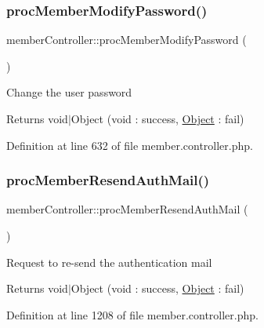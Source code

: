 \subsubsection{\texorpdfstring{proc\+Member\+Modify\+Password()}{procMemberModifyPassword()}}
{\footnotesize\ttfamily member\+Controller\+::proc\+Member\+Modify\+Password (\begin{DoxyParamCaption}{ }\end{DoxyParamCaption})}

Change the user password

\begin{DoxyReturn}{Returns}
void$\vert$\+Object (void \+: success, \hyperlink{classObject}{Object} \+: fail) 
\end{DoxyReturn}


Definition at line 632 of file member.\+controller.\+php.

\mbox{\label{classmemberController_aa0e4416a4e98fc31701ba68581b7c14b}} 
\subsubsection{\texorpdfstring{proc\+Member\+Resend\+Auth\+Mail()}{procMemberResendAuthMail()}}
{\footnotesize\ttfamily member\+Controller\+::proc\+Member\+Resend\+Auth\+Mail (\begin{DoxyParamCaption}{ }\end{DoxyParamCaption})}

Request to re-\/send the authentication mail

\begin{DoxyReturn}{Returns}
void$\vert$\+Object (void \+: success, \hyperlink{classObject}{Object} \+: fail) 
\end{DoxyReturn}


Definition at line 1208 of file member.\+controller.\+php.

\mbox{\label{classmemberController_ab0515bd2aae55dbda2049d39612ef6b2}} 
